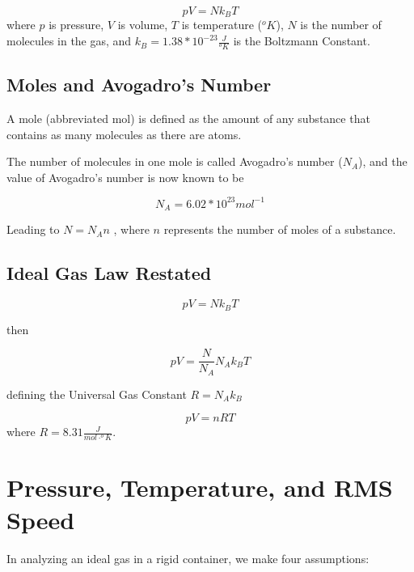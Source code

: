 \documentclass[14pt]{memoir}
\begin{document}
\begin{equation}
pV = N k_B T
\end{equation}
where $p$ is pressure, $V$ is volume, $T$ is temperature ($^o K$), $N$ is the number of molecules in the gas, and $k_B = 1.38 * 10^{-23} \frac{J}{^o K}$ is the Boltzmann Constant. 

\subsection{Moles and Avogadro's Number}

A mole (abbreviated mol) is defined as the amount of any substance that contains as many molecules as there are atoms.

The number of molecules in one mole is called Avogadro’s number ($N_A$),  and the value of Avogadro’s number is now known to be

\begin{equation}
N_A = 6.02 * 10^{23} mol^{-1}
\end{equation}

Leading to  $N=N_A n$ , where $n$ represents the number of moles of a substance.

\subsection{Ideal Gas Law Restated}

\begin{equation}
pV = N k_B T
\end{equation}

then

\begin{equation}
pV = \frac{N}{N_A} N_A k_B T
\end{equation}

defining the Universal Gas Constant $R = N_A k_B$

\begin{equation}
pV = n R T
\end{equation}
where $R = 8.31 \frac{J}{mol \cdot ^oK}$.

\section{Pressure, Temperature, and RMS Speed}

In analyzing an ideal gas in a rigid container, we make four assumptions:
\end{document}
